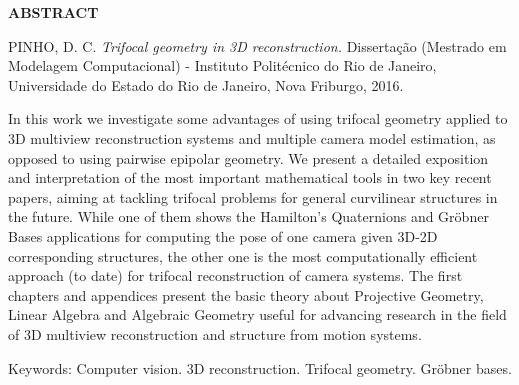 \begin{center}
{\bf ABSTRACT}
\end{center}

\vspace{1 cm}

\begin{center}
\begin{minipage}{1\textwidth}
\noindent PINHO, D. C. {\it Trifocal geometry in 3D reconstruction.} Dissertação (Mestrado em Modelagem Computacional) - Instituto Politécnico do Rio de Janeiro, Universidade do Estado do Rio de Janeiro, Nova Friburgo, 2016.
\end{minipage}
\end{center}

\vspace{1 cm}

\begin{center}
\begin{minipage}{1\textwidth}
\qquad In this work we investigate some advantages of using trifocal geometry applied to 3D multiview reconstruction systems and multiple camera model estimation, as opposed to using pairwise epipolar geometry. We present a detailed exposition and interpretation of the most important mathematical tools in two key recent papers, aiming at tackling trifocal problems for general curvilinear structures in the future. While one of them shows the Hamilton's Quaternions and Gr\"obner Bases applications for computing the pose of one camera given 3D-2D corresponding structures, the other one is the most computationally efficient approach (to date) for trifocal reconstruction of camera systems. The first chapters and appendices present the basic theory about Projective Geometry, Linear Algebra and Algebraic Geometry useful for advancing research in the field of 3D multiview reconstruction and structure from motion systems.
\end{minipage}
\end{center}
 
\vspace{1 cm}

\begin{flushleft}
Keywords: Computer vision. 3D reconstruction. Trifocal geometry. Gr\"obner bases. 
\end{flushleft}

\newpage